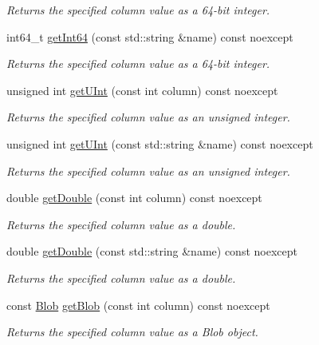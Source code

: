 \begin{DoxyCompactItemize}
\begin{DoxyCompactList}\small\item\em Returns the specified column value as a 64-\/bit integer. \end{DoxyCompactList}\item 
int64\-\_\-t \hyperlink{a00010_aea6d24bb9247bfc52fe77d62be961dd2}{get\-Int64} (const std\-::string \&name) const noexcept
\begin{DoxyCompactList}\small\item\em Returns the specified column value as a 64-\/bit integer. \end{DoxyCompactList}\item 
unsigned int \hyperlink{a00010_a971fb706b9215a89532ac48640f94832}{get\-U\-Int} (const int column) const noexcept
\begin{DoxyCompactList}\small\item\em Returns the specified column value as an unsigned integer. \end{DoxyCompactList}\item 
unsigned int \hyperlink{a00010_a18315a8379249158c3f827441e8f6de0}{get\-U\-Int} (const std\-::string \&name) const noexcept
\begin{DoxyCompactList}\small\item\em Returns the specified column value as an unsigned integer. \end{DoxyCompactList}\item 
double \hyperlink{a00010_a679e56078c78e01c99fa08ad0b7ee782}{get\-Double} (const int column) const noexcept
\begin{DoxyCompactList}\small\item\em Returns the specified column value as a double. \end{DoxyCompactList}\item 
double \hyperlink{a00010_a45e9dd813439e8cda7608e18c1ccce5f}{get\-Double} (const std\-::string \&name) const noexcept
\begin{DoxyCompactList}\small\item\em Returns the specified column value as a double. \end{DoxyCompactList}\item 
const \hyperlink{a00002}{Blob} \hyperlink{a00010_a80028dc9f221648fe2398b40bd380c31}{get\-Blob} (const int column) const noexcept
\begin{DoxyCompactList}\small\item\em Returns the specified column value as a Blob object. \end{DoxyCompactList}\item 

\end{DoxyCompactItemize}

